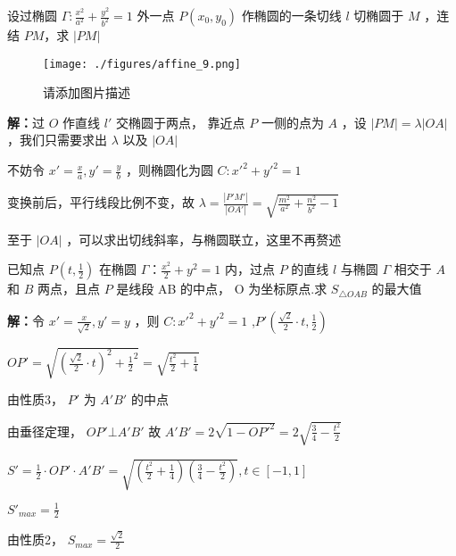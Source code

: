 \begin{corollary}{}
设过椭圆 \(\Gamma:\frac{x^2}{a^2}+\frac{y^2}{b^2}=1\) 外一点 \(P(x_0,y_0)\) 作椭圆的一条切线 \(l\) 切椭圆于 \(M\) ，连结 \(PM\)，求 \(|PM|\)
\begin{figure}[ht]
\centering
\texttt{[image: ./figures/affine\_9.png]}
\caption{请添加图片描述} \label{affine_fig9}
\end{figure}
\textbf{解：}过 \(O\) 作直线 \(l'\) 交椭圆于两点， 靠近点 \(P\) 一侧的点为 \(A\) ，设 \(|PM|=\lambda|OA|\) ，我们只需要求出 \(\lambda\) 以及 \(|OA|\) 

不妨令 \(x'=\frac{x}{a},y'=\frac{y}{b}\) ，则椭圆化为圆 \(C:x'^2+y'^2=1\)

变换前后，平行线段比例不变，故 \(\lambda=\frac{|P'M'|}{|OA'|}=\sqrt{\frac{m^2}{a^2}+\frac{n^2}{b^2}-1}\) 

至于 \(|OA|\) ，可以求出切线斜率，与椭圆联立，这里不再赘述
\end{corollary}

\begin{example}{}
已知点 \(P\left(t,\frac{1}{2}\right)\) 在椭圆 \(\Gamma：\frac{x^2}{2}+y^2=1\) 内，过点 \(P\) 的直线 \(l\) 与椭圆 \(\Gamma\) 相交于 \(A\) 和 \(B\) 两点，且点 \(P\) 是线段 AB 的中点， O 为坐标原点.求 \(S_{\triangle OAB}\) 的最大值

\textbf{解：}令 \(x'=\frac{x}{\sqrt{2}},y'=y\) ，则 \(C:x'^2+y'^2=1\) ,\(P'\left(\frac{\sqrt{2}}{2}\cdot t,\frac{1}{2}\right)\)

\(OP'=\sqrt{\left(\frac{\sqrt{2}}{2}\cdot t\right)^2+{\frac{1}{2}}^2}=\sqrt{\frac{t^2}{2}+\frac{1}{4}}\)

由性质3， \(P'\) 为 \(A'B'\) 的中点

由垂径定理， \(OP'\bot A'B'\) 
故 \(A'B'=2\sqrt{1-OP'^2}=2\sqrt{\frac{3}{4}-\frac{t^2}{2}}\)

\(S'=\frac{1}{2}\cdot OP' \cdot A'B'=\sqrt{\left(\frac{t^2}{2}+\frac{1}{4}\right)\left(\frac{3}{4}-\frac{t^2}{2}\right)},t\in[-1,1]\)

\(S'_{max}=\frac{1}{2}\)

由性质2， \(S_{max}=\frac{\sqrt{2}}{2}\) 
\end{example}

